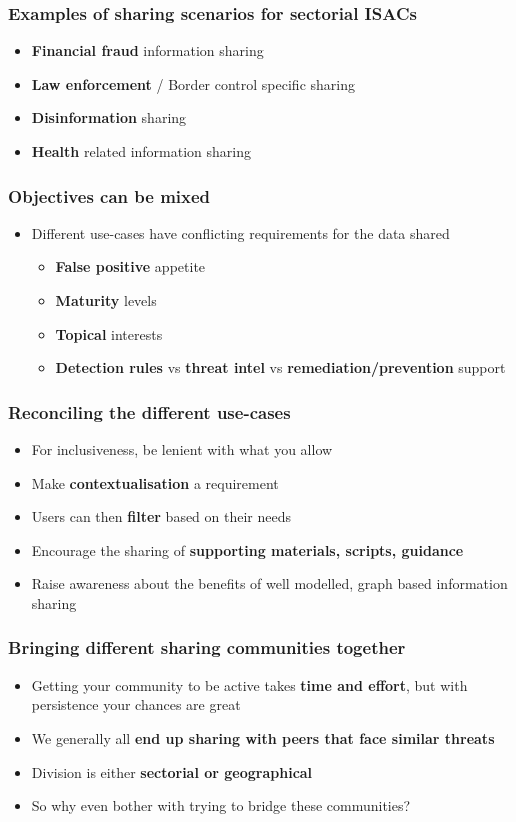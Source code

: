 \begin{frame}
	\frametitle{Examples of sharing scenarios for sectorial ISACs}
	\begin{itemize}
		\item \textbf{Financial fraud} information sharing
		\item \textbf{Law enforcement} / Border control specific sharing
		\item \textbf{Disinformation} sharing
		\item \textbf{Health} related information sharing
	\end{itemize}
\end{frame}

\begin{frame}
	\frametitle{Objectives can be mixed}
	\begin{itemize}
		\item Different use-cases have conflicting requirements for the data shared
		\begin{itemize}
			\item \textbf{False positive} appetite
			\item \textbf{Maturity} levels
			\item \textbf{Topical} interests
			\item \textbf{Detection rules} vs \textbf{threat intel} vs \textbf{remediation/prevention} support
		\end{itemize}
	\end{itemize}
\end{frame}

\begin{frame}
	\frametitle{Reconciling the different use-cases}
	\begin{itemize}
		\item For inclusiveness, be lenient with what you allow
		\item Make \textbf{contextualisation} a requirement
		\item Users can then \textbf{filter} based on their needs
		\item Encourage the sharing of \textbf{supporting materials, scripts, guidance}
		\item Raise awareness about the benefits of well modelled, graph based information sharing
	\end{itemize}
\end{frame}

\begin{frame}
	\frametitle{Bringing different sharing communities together}
	\begin{itemize}
		\item Getting your community to be active takes \textbf{time and effort}, but with persistence your chances are great
		\item We generally all \textbf{end up sharing with peers that face similar threats}
		\item Division is either \textbf{sectorial or geographical}
		\item So why even bother with trying to bridge these communities?
	\end{itemize}
\end{frame}

